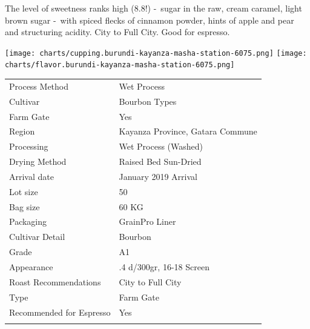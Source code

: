 \documentclass[10pt,twoside,footinclude=true,headinclude=true]{scrbook} %
\newlength{\mysize}
\newcommand{\myfontsize}[1]{
  \setlength{\mysize}{#1pt}
  \fontsize{\mysize}{1.2\mysize}
  \selectfont
}
\begin{document}
\begin{addmargin}[2.2em]{2.2em}
\small
\justify
The level of sweetness ranks high (8.8!) - sugar in the raw, cream caramel, light brown sugar - with spiced flecks of cinnamon powder, hints of apple and pear and structuring acidity. City to Full City. Good for espresso.
\end{addmargin}

\centering
\vspace{2em}
\texttt{[image: charts/cupping.burundi-kayanza-masha-station-6075.png]}
\texttt{[image: charts/flavor.burundi-kayanza-masha-station-6075.png]}

\vspace{1em}
\begin{table}[htbp]
\myfontsize{7}
\hspace*{2.2em}
\begin{tabular}{ >{\raggedleft\arraybackslash}p{3.6cm}!{\color{lightgray}\vrule}p{7cm} }
\hline
  Process Method & Wet Process \\
  \hline
  Cultivar & Bourbon Types \\
  \hline
  Farm Gate & Yes \\
  \hline
  Region & Kayanza Province, Gatara Commune \\
  \hline
  Processing & Wet Process (Washed) \\
  \hline
  Drying Method & Raised Bed Sun-Dried \\
  \hline
  Arrival date & January 2019 Arrival \\
  \hline
  Lot size & 50 \\
  \hline
  Bag size & 60 KG \\
  \hline
  Packaging & GrainPro Liner \\
  \hline
  Cultivar Detail & Bourbon \\
  \hline
  Grade & A1 \\
  \hline
  Appearance & .4 d/300gr, 16-18 Screen \\
  \hline
  Roast Recommendations & City to Full City \\
  \hline
  Type & Farm Gate \\
  \hline
  Recommended for Espresso & Yes \\
  \hline

\end{tabular}
\end{table}
\end{document}
